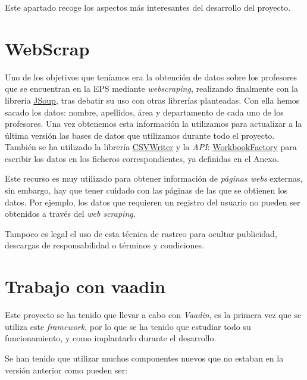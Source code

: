 
Este apartado recoge los aspectos más interesantes del desarrollo del proyecto.

\section{WebScrap}

Uno de los objetivos que teníamos era la obtención de datos sobre los profesores que se encuentran en la EPS mediante \emph{webscraping}, realizando finalmente con la librería \href{https://jsoup.org/}{JSoup}, tras debatir su uso con otras librerías planteadas. 
Con ella hemos sacado los datos: nombre, apellidos, área y departamento de cada uno de los profesores. Una vez obtenemos esta información la utilizamos para actualizar a la última versión las bases de datos que utilizamos durante todo el proyecto.
También se ha utilizado la librería \href{https://opencsv.sourceforge.net/apidocs/com/opencsv/CSVWriter.html}{CSVWriter} y la \emph{API}: \href{https://poi.apache.org/apidocs/dev/org/apache/poi/ss/usermodel/WorkbookFactory.html}{WorkbookFactory} para escribir los datos en los ficheros correspondientes, ya definidas en el Anexo.

Este recurso es muy utilizado para obtener información de \emph{páginas webs} externas, sin embargo, hay que tener cuidado con las páginas de las que se obtienen los datos. Por ejemplo, los datos que requieren un registro del usuario no pueden ser obtenidos a través del \emph{web scraping}.

Tampoco es legal el uso de esta técnica de rastreo para ocultar publicidad, descargas de responsabilidad o términos y condiciones.~\cite{webScrap}

\section{Trabajo con vaadin}

Este proyecto se ha tenido que llevar a cabo con \emph{Vaadin}, es la primera vez que se utiliza este \emph{framework}, por lo que se ha tenido que estudiar todo su funcionamiento, y como implantarlo durante el desarrollo.

Se han tenido que utilizar muchos componentes nuevos que no estaban en la versión anterior como pueden ser:

